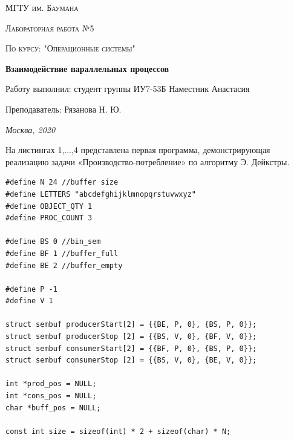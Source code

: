 \documentclass[12pt]{report}
\begin{document}
 
\begin{titlepage}
	\centering
	{\scshape\LARGE МГТУ им. Баумана \par}
	\vspace{3cm}
	{\scshape\Large Лабораторная работа №5\par}
	\vspace{0.5cm}	
	{\scshape\Large По курсу: "Операционные системы"\par}
	\vspace{1.5cm}
	{\huge\bfseries Взаимодействие параллельных процессов\par}
	\vspace{2cm}
	\Large Работу выполнил: студент группы ИУ7-53Б Наместник Анастасия\par
	\vspace{0.5cm}
	\Large Преподаватель:  Рязанова Н. Ю.\par

	\vfill
	\large \textit {Москва, 2020} \par
\end{titlepage}

\newpage

На листингах 1,...,4 представлена первая программа, демонстрирующая реализацию задачи «Производство-потребление» по алгоритму Э. Дейкстры.

\begin{lstlisting}[label=some-code,caption=Начальные установки]
#define N 24 //buffer size
#define LETTERS "abcdefghijklmnopqrstuvwxyz"
#define OBJECT_QTY 1
#define PROC_COUNT 3

#define BS 0 //bin_sem
#define BF 1 //buffer_full
#define BE 2 //buffer_empty

#define P -1
#define V 1

struct sembuf producerStart[2] = {{BE, P, 0}, {BS, P, 0}};
struct sembuf producerStop [2] = {{BS, V, 0}, {BF, V, 0}};
struct sembuf consumerStart[2] = {{BF, P, 0}, {BS, P, 0}};
struct sembuf consumerStop [2] = {{BS, V, 0}, {BE, V, 0}};

int *prod_pos = NULL;
int *cons_pos = NULL;
char *buff_pos = NULL;

const int size = sizeof(int) * 2 + sizeof(char) * N;
\end{lstlisting}
\end{document}
